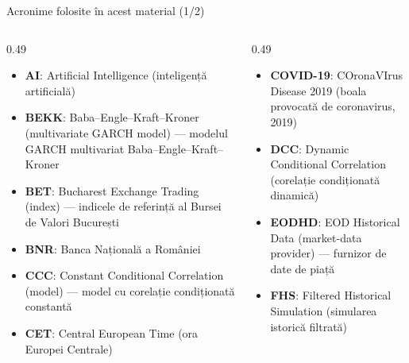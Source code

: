 \providecommand{\tsaapplink}[3]{\hypertarget{#2}{}\hyperlink{#1}{\beamergotobutton{#3}}}  %
\providecommand{\tsaappback}[2]{\begin{tikzpicture}[remember picture,overlay]\node[anchor=south east] at ([xshift=-3mm,yshift=7mm]current page.south east){\hyperlink{#1}{\beamerreturnbutton{#2}}};\end{tikzpicture}}  %
\providecommand{\tsachlink}[2]{\href{#1}{#2}}  %
\providecommand{\tsachlinkt}[2]{\href{#1}{\usebeamercolor[fg]{frametitle}#2}}  %


{
\begin{frame}[noframenumbering]
    \titlepage
\end{frame}
}
\begin{frame}{Acronime folosite în acest material (1/2)}
\begin{columns}[T]
\begin{column}{0.49\textwidth}
\begin{itemize}\setlength{\itemsep}{0pt}
    \item \textbf{AI}: Artificial Intelligence (inteligență artificială)
    \item \textbf{BEKK}: Baba–Engle–Kraft–Kroner (multivariate GARCH model) — modelul GARCH multivariat Baba–Engle–Kraft–Kroner
    \item \textbf{BET}: Bucharest Exchange Trading (index) — indicele de referință al Bursei de Valori București
    \item \textbf{BNR}: Banca Națională a României
    \item \textbf{CCC}: Constant Conditional Correlation (model) — model cu corelație condiționată constantă
    \item \textbf{CET}: Central European Time (ora Europei Centrale)
\end{itemize}
\end{column}
\begin{column}{0.49\textwidth}
\begin{itemize}\setlength{\itemsep}{0pt}
    \item \textbf{COVID-19}: COronaVIrus Disease 2019 (boala provocată de coronavirus, 2019)
    \item \textbf{DCC}: Dynamic Conditional Correlation (corelație condiționată dinamică)
    \item \textbf{EODHD}: EOD Historical Data (market-data provider) — furnizor de date de piață
    \item \textbf{FHS}: Filtered Historical Simulation (simularea istorică filtrată)
\end{itemize}
\end{column}
\end{columns}
\end{frame}
